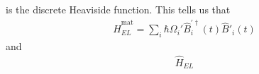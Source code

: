 \documentclass{article}
\begin{document}
is the discrete Heaviside function. This tells us that
\begin{equation}
\begin{split}
\hat{H}_{EL}^\mathrm{mat} = \sum_i\hbar\Omega_i'\hat{B}_i^{\prime\dagger}(t)\hat{B}'_i(t)
\end{split}
\end{equation}
and
\begin{equation}
\begin{split}
\hat{H}_{EL} 

\end{split}
\end{equation}
\end{document}
